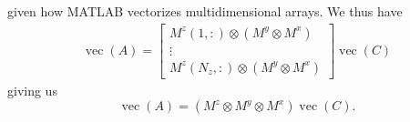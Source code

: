 \documentclass{article}
\DeclareMathOperator{\vecm}{vec}
\begin{document}
given how MATLAB vectorizes multidimensional arrays. We thus have
\begin{equation}
\begin{aligned}
	\vecm(A) = \begin{bmatrix}
		M^z(1,:) \otimes (M^y \otimes M^x) \\
		\vdots \\
		M^z(N_z,:) \otimes ( M^y \otimes M^x) 
	\end{bmatrix} \vecm(C)
\end{aligned}
\end{equation}
giving us
\begin{equation}
	\vecm(A) = (M^z \otimes M^y \otimes M^x) \vecm(C).
\end{equation}


\end{document}
